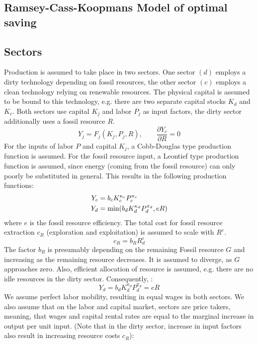 \subsection{Ramsey-Cass-Koopmans Model of optimal saving}


\subsection{Sectors}

Production is assumed to take place in two sectors. One sector $(d)$ employs a dirty technology depending on fossil resources, the other sector $(c)$ employs a clean technology relying on renewable resources. The physical capital is assumed to be bound to this technology, e.g. there are two separate capital stocks $K_d$ and $K_c$. Both sectors use capital $K_j$ and labor $P_j$ as input factors, the dirty sector additionally uses a fossil resource $R$.
\begin{equation}
	Y_j = F_j(K_j,P_j,R), \qquad \frac{\partial Y_c}{\partial R} = 0 	
	\label{eq:production}
\end{equation}
For the inputs of labor $P$ and capital $K_j$, a Cobb-Douglas type production function is assumed. For the fossil resource input, a Leontief type production function is assumed, since energy (coming from the fossil resource) can only poorly be substituted in general. This results in the following production functions:
\begin{align}
	Y_c &= b_c K_c^{\kappa_c} P_c^{\pi_c} \\
	Y_d &= {\rm min}(b_d K_d^{\kappa_d} P_d ^{\pi_d}, e R)
\end{align}
where $e$ is the fossil resource efficiency.
The total cost for fossil resource extraction $c_R$ (exploration and exploitation) is assumed to scale with $R^{\varepsilon}$.
\begin{equation}
	c_R = b_R R_d^{\varepsilon}
	\label{resource_extraction_cost}
\end{equation}
The factor $b_R$ is presumably depending on the remaining Fossil resource $G$ and increasing as the remaining resource decreases. It is assumed to diverge, as $G$ approaches zero. Also, efficient allocation of resource is assumed, e.g. there are no idle resources in the dirty sector. Consequently, :
\begin{equation}
	Y_d = b_d K_d^{\kappa_d} P_d^{\pi_d} = e R
	\label{efficient_resource_extraction}
\end{equation}
We assume perfect labor mobility, resulting in equal wages in both sectors. We also assume that on the labor and capital market, sectors are price takers, meaning, that wages and capital rental rates are equal to the marginal increase in output per unit input. (Note that in the dirty sector, increase in input factors also result in increasing resource costs $c_R$):
